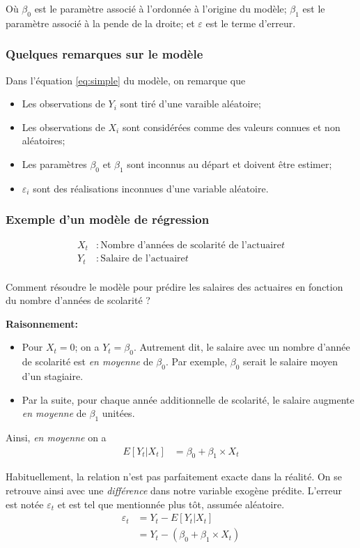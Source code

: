 \documentclass[11pt,french]{report}
\begin{document}
Où $\beta_0$ est le paramètre associé à l'ordonnée à l'origine du modèle;
$\beta_1$ est le paramètre associé à la pende de la droite;
et $\varepsilon$ est le terme d'erreur.

\subsubsection*{Quelques remarques sur le modèle}
Dans l'équation \ref{eq:simple} du modèle, on remarque que 
\begin{itemize}
\item Les observations de $Y_i$ sont tiré d'une varaible aléatoire;
\item Les observations de $X_i$ sont considérées comme des valeurs connues et non aléatoires;
\item Les paramètres $\beta_0$ et $\beta_1$ sont inconnus au départ et doivent être estimer;
\item $\varepsilon_i$ sont des réalisations inconnues d'une variable aléatoire.
\end{itemize}

\subsubsection*{Exemple d'un modèle de régression}
\begin{align*}
X_t &: \text{Nombre d'années de scolarité de l'actuaire} t \\
Y_t &: \text{Salaire de l'actuaire} t\\
\end{align*}

Comment résoudre le modèle pour prédire les salaires des actuaires en fonction du nombre d'années de scolarité ?

\textbf{Raisonnement:}
\begin{itemize}
\item Pour $X_t = 0$; on a $Y_t = \beta_0$. Autrement dit, le salaire avec un nombre d'année de scolarité est \emph{en moyenne} de $\beta_0$. Par exemple, $\beta_0$ serait le salaire moyen d'un stagiaire.
\item Par la suite, pour chaque année additionnelle de scolarité, le salaire augmente \emph{en moyenne }de $\beta_1$ unitées.
\end{itemize}
Ainsi, \emph{en moyenne} on a 
\begin{align*}
E[Y_t|X_t] &= \beta_0 + \beta_1\times X_t
\end{align*}

Habituellement, la relation n'est pas parfaitement exacte dans la réalité. On se retrouve ainsi avec une \emph{différence} dans notre variable exogène prédite. L'erreur est notée $\varepsilon_t$ et est tel que mentionnée plus tôt, assumée aléatoire.
\begin{align*}
\varepsilon_t &= Y_t - E[Y_t|X_t] \\
&= Y_t - (\beta_0 + \beta_1\times X_t)\\
\end{align*}
\end{document}
